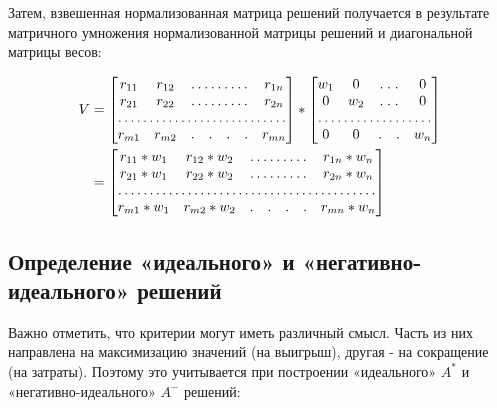 \documentclass{article}
\begin{document}
        Затем, взвешенная нормализованная матрица решений получается в результате матричного
        умножения нормализованной матрицы решений и диагональной матрицы весов:

        \begin{equation}
        \label{eq:weighted_norm_decision_matrix}
            \begin{alignedat}{2}
                V &= \begin{bmatrix}
                    r_{11}&  r_{12}& \hdotsfor{4} & r_{1n}\\
                    r_{21}&  r_{22}& \hdotsfor{4} & r_{2n}\\
                    \hdotsfor{7}\\
                    r_{m1}&  r_{m2}& . & . & . & . & r_{mn}\\
                \end{bmatrix} * \begin{bmatrix}
                    w_{1}&  0 & \hdotsfor{2} & 0\\
                    0 &  w_{2}& \hdotsfor{2} & 0\\
                    \hdotsfor{5}\\
                    0 &  0 & . & . & w_{n}\\
                \end{bmatrix} \\
                &= \begin{bmatrix}
                    r_{11}*w_{1}&  r_{12} * w_{2}& \hdotsfor{4} & r_{1n}*w_{n}\\
                    r_{21}*w_{1}&  r_{22} * w_{2}& \hdotsfor{4} & r_{2n}*w_{n}\\
                    \hdotsfor{7}\\
                    r_{m1}*w_{1}&  r_{m2} * w_{2}& . & . & . & . & r_{mn}*w_{n}\\
                \end{bmatrix}
                \end{alignedat}
        \end{equation}

    \subsection{Определение «идеального» и «негативно-идеального» решений}
        Важно отметить, что критерии могут иметь различный смысл. Часть из них направлена на
        максимизацию значений (на выигрыш), другая - на сокращение (на затраты). Поэтому это
        учитывается при построении «идеального» \(A^{*}\) и «негативно-идеального» \(A^{-}\)
        решений:
\end{document}
